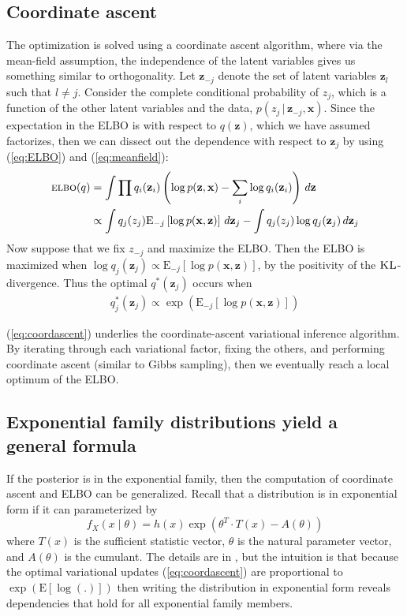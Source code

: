 \documentclass[11pt]{article}
\newcommand{\bx}{\ensuremath{\mathbf{x}}}
\newcommand{\bz}{\ensuremath{\mathbf{z}}}
\newcommand{\g}{\,\vert\,}
\newcommand{\ELBO}{\textsc{elbo}}
\newcommand{\E}{\mathrm{E}}
\begin{document}
\subsection{Coordinate ascent}
The optimization is solved using a coordinate ascent algorithm, where via the mean-field assumption, the independence of the latent variables gives us something similar to orthogonality. Let $\bz_{-j}$ denote the set of latent variables $\bz_l$ such that $l \neq j$. Consider the complete conditional probability of $z_j$, which is a function of the other latent variables and the data, $p(z_j \g \bz_{-j}, \bx)$. Since the expectation in the \textsc{ELBO} is with respect to $q(\bz)$, which we have assumed factorizes, then we can dissect out the dependence \cite{Bishop2006} with respect to $\bz_j$ by using (\ref{eq:ELBO}) and (\ref{eq:meanfield}):
\begin{align}
\ELBO(q) &= \int \prod q_i(\bz_i) \left(\log p(\bz, \bx) - \sum_i \log q_i(\bz_i) \right) \,d\bz \nonumber \\
			&\propto \int q_j(z_j) \E_{-j}\left[\log p(\bx, \bz) \right] \, d\bz_j - \int q_j(z_j) \log q_j(\bz_j) \, d\bz_j
\end{align}
Now suppose that we fix $z_{-j}$ and maximize the \textsc{ELBO}. Then the \textsc{ELBO} is maximized when $\log q_j(\bz_j) \propto \E_{-j}\left[\log p(\bx, \bz) \right]$, by the positivity of the $\textsc{KL}$-divergence. Thus the optimal $q^*(\bz_j)$ occurs when
\begin{align} \label{eq:coordascent}
q^*_j(\bz_j) \propto \exp\left(\E_{-j}\left[\log p(\bx, \bz) \right]\right)
\end{align}

(\ref{eq:coordascent}) underlies the coordinate-ascent variational inference algorithm. By iterating through each variational factor, fixing the others, and performing coordinate ascent (similar to Gibbs sampling), then we eventually reach a local optimum of the \textsc{ELBO}.

\subsection{Exponential family distributions yield a general formula}

If the posterior is in the exponential family, then the computation of coordinate ascent and ELBO can be generalized. Recall that a distribution is in exponential form if it can parameterized by 
\begin{equation}
f_X(x\mid\theta) = h(x) \exp \left (\theta^T \cdot T(x) -A(\theta)\right )
\end{equation}
where $T(x)$ is the sufficient statistic vector, $\theta$ is the natural parameter vector, and $A(\theta)$ is the cumulant. The details are in \cite{Hughes2015}, but the intuition is that because the optimal variational updates (\ref{eq:coordascent}) are proportional to $\exp(\E[\log(.)])$ then writing the distribution in exponential form reveals dependencies that hold for all exponential family members.
\end{document}
